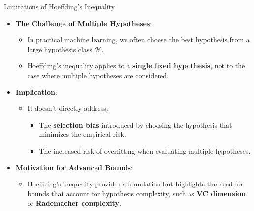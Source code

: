\documentclass[
  ignorenonframetext,
]{beamer}
\providecommand{\tightlist}{%
  \setlength{\itemsep}{0pt}\setlength{\parskip}{0pt}}\usepackage{longtable,booktabs,array}
\begin{document}
\begin{frame}{Limitations of Hoeffding's Inequality}
\label{limitations-of-hoeffdings-inequality}
\begin{itemize}
\tightlist
\item
  \textbf{The Challenge of Multiple Hypotheses}:

  \begin{itemize}
  \tightlist
  \item
    In practical machine learning, we often choose the best hypothesis
    from a large hypothesis class \(\mathcal{H}\).
  \item
    Hoeffding's inequality applies to a \textbf{single fixed
    hypothesis}, not to the case where multiple hypotheses are
    considered.
  \end{itemize}
\item
  \textbf{Implication}:

  \begin{itemize}
  \tightlist
  \item
    It doesn't directly address:

    \begin{itemize}
    \tightlist
    \item
      The \textbf{selection bias} introduced by choosing the hypothesis
      that minimizes the empirical risk.
    \item
      The increased risk of overfitting when evaluating multiple
      hypotheses.
    \end{itemize}
  \end{itemize}
\item
  \textbf{Motivation for Advanced Bounds}:

  \begin{itemize}
  \tightlist
  \item
    Hoeffding's inequality provides a foundation but highlights the need
    for bounds that account for hypothesis complexity, such as
    \textbf{VC dimension} or \textbf{Rademacher complexity}.
  \end{itemize}
\end{itemize}
\end{frame}
\end{document}
